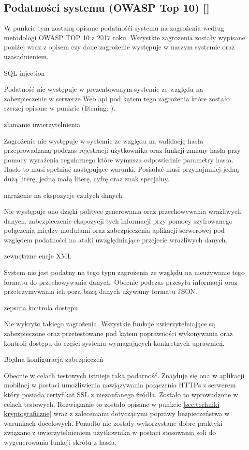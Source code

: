 \subsection{Podatności systemu (OWASP Top 10) [\StudentA]}
W punkcie tym zostaną opisane podatnośći systemu na zagrożenia według metodologi OWASP TOP 10 z 2017 roku. Wszystkie zagrożenia zostały wypisane poniżej wraz z opisem czy dane zagrożenie występuje w naszym systemie oraz uzasadnieniem.
\begin{enumerate*}
	\item SQL injection 
	
	 Podatność nie występuje w prezentowanym systemie ze względu na zabezpieczenie w serwerze Web api pod kątem tego zagrożenia które zostało szerzej opisane w punkcie (litening: ).
	\item złamanie uwierzytelnienia 
	
	 Zagrożenie nie występuje w systemie ze względu na walidację hasła przeprowadzaną podczas rejestracji użytkownika oraz funkcji zmiany hasła przy pomocy wyrażenia regularnego które wymusza odpowiednie parametry hasła. Hasło to musi spełniać następujące warunki. Posiadać musi przynajmniej jedną dużą literę, jedną małą literę,  cyfrę oraz znak specjalny.
	\item narażenie na ekspozycje czułych danych 
	
	 Nie występuje ono dzięki polityce generowania oraz przechowywania wrażliwych danych,  zabezpieczenie ekspozycji tych informacji przy pomocy szyfrowanego połączenia między modułami oraz zabezpieczenia aplikacji serwerowej pod względem podatności na ataki uwzględniające przejecie wrażliwych danych.
	\item zewnętrzne encje XML 
	
	 System \NazwaSys nie jest podatny na tego typu zagrożenia ze względu na nieużywanie tego formatu do przechowywania danych. Obecnie podczas przesyłu informacji oraz przetrzymywania ich poza bazą danych używamy formatu JSON.
	\item zepsuta kontrola dostępu 
	
	 Nie wykryto takiego zagrożenia. Wszystkie funkcje uwierzytelniające są zabezpieczone oraz przetestowane pod kątem poprawności wykonywania oraz kontroli dostępu do części systemu wymagających konkretnych uprawnień.
	 \item Błędna konfiguracja zabezpieczeń
	 
	 Obecnie w celach testowych istnieje taka podatność. Znajduje się ona w aplikacji mobilnej w  postaci umożliwienia nawiązywania połączenia HTTPs z serwerem który posiada certyfikat SSL z niezaufanego źródła. Zostało to wprowadzone w celach testowych. Rozwiązanie to zostało opisane w punkcie \ref{sec:techniki kryptograficzne} wraz z zaleceniami dotyczącymi poprawy bezpieczeństwa w warunkach docelowych. Ponadto nie zostały wykorzystane dobre praktyki związane z uwierzytelnieniem użytkownika w postaci stosowania soli do wygenerowania funkcji skrótu z hasła.
	 

\end{enumerate*}
